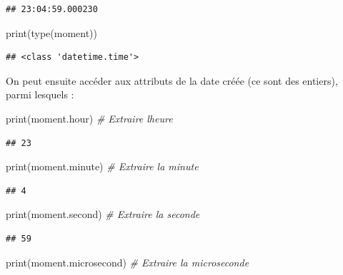 \documentclass[
  12pt,
]{book}
\newenvironment{Shaded}{\begin{snugshade}}{\end{snugshade}}
\newcommand{\BuiltInTok}[1]{#1}
\newcommand{\CommentTok}[1]{\textcolor[rgb]{0.56,0.35,0.01}{\textit{#1}}}
\newcommand{\NormalTok}[1]{#1}
\numberwithin{equation}{section}
\numberwithin{countremarque}{section}
\begin{document}
\begin{lstlisting}
## 23:04:59.000230
\end{lstlisting}

\begin{Shaded}
\begin{Highlighting}[]
\BuiltInTok{print}\NormalTok{(}\BuiltInTok{type}\NormalTok{(moment))}
\end{Highlighting}
\end{Shaded}

\begin{lstlisting}
## <class 'datetime.time'>
\end{lstlisting}

On peut ensuite accéder aux attributs de la date créée (ce sont des entiers), parmi lesquels :

\begin{Shaded}
\begin{Highlighting}[]
\BuiltInTok{print}\NormalTok{(moment.hour) }\CommentTok{\# Extraire l\textquotesingle{}heure}
\end{Highlighting}
\end{Shaded}

\begin{lstlisting}
## 23
\end{lstlisting}

\begin{Shaded}
\begin{Highlighting}[]
\BuiltInTok{print}\NormalTok{(moment.minute) }\CommentTok{\# Extraire la minute}
\end{Highlighting}
\end{Shaded}

\begin{lstlisting}
## 4
\end{lstlisting}

\begin{Shaded}
\begin{Highlighting}[]
\BuiltInTok{print}\NormalTok{(moment.second) }\CommentTok{\# Extraire la seconde}
\end{Highlighting}
\end{Shaded}

\begin{lstlisting}
## 59
\end{lstlisting}

\begin{Shaded}
\begin{Highlighting}[]
\BuiltInTok{print}\NormalTok{(moment.microsecond) }\CommentTok{\# Extraire la microseconde}
\end{Highlighting}
\end{Shaded}
\end{document}
